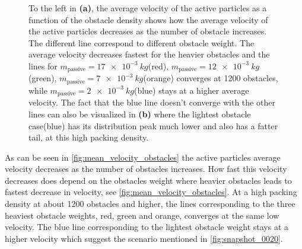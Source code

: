 \begin{figure}[htpb!]
    \centering
    \caption{To the left in \textbf{(a)}, the average velocity of the active particles as a function of the obstacle density shows 
	    how the average velocity of the active particles decreases as the number of obstacle increases. The 
	    different line correspond to different obstacle weight. The average velocity decreases fastest for the 
	    heavier obstacles and the lines for $m_{\text{passive}}=\SI{17e-3}{kg}$(red), 
	    $m_{\text{passive}}=\SI{12e-3}{kg}$(green), $m_{\text{passive}}=\SI{7e-3}{kg}$(orange) converges at 
	    \num{1200} obstacles, while $m_{\text{passive}}=\SI{2e-3}{kg}$(blue) stays at a higher average velocity. 
	    The fact that the blue line doesn't converge with the other lines can also be visualized in \textbf{(b)} 
	    where the lightest obstacle case(blue) has its distribution peak much lower and also has a fatter tail, at this 
	    high packing density.
    }
    \label{fig:mean_velocity}
\end{figure}

As can be seen in \cref{fig:mean_velocity_obstacles} the active particles average velocity decreases as the number 
of obstacles increases. How fast this velocity decreases does depend on the obstacles weight where heavier obstacles 
leads to fastest decrease in velocity, see \cref{fig:mean_velocity_obstacles}. At a high packing density at about 
\num{1200} obstacles and higher, the lines corresponding to the three heaviest obstacle weights, red, green and orange, 
converges at the same low velocity. The blue line corresponding to the lightest obstacle weight stays at a higher velocity 
which suggest the scenario mentioned in \cref{fig:snapshot_0020}. 


